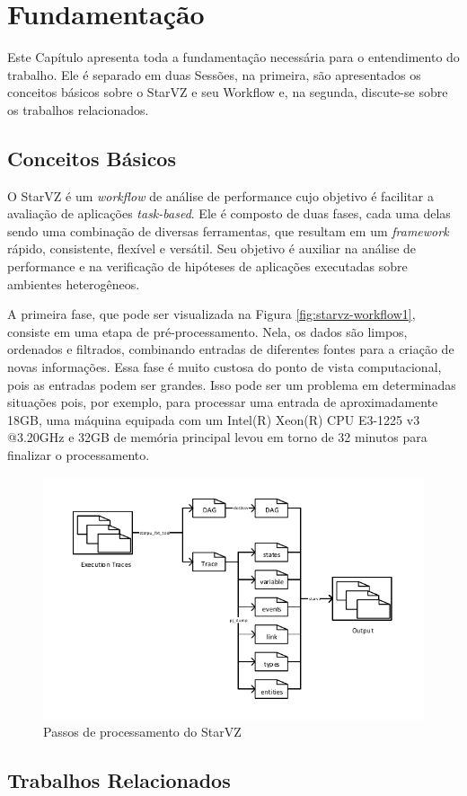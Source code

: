 \chapter{Fundamentação} \label{ch:fundamentation}

Este Capítulo apresenta toda a fundamentação necessária para o entendimento do trabalho. 
Ele é separado em duas Sessões, na primeira, são apresentados os conceitos básicos sobre 
o StarVZ e seu Workflow e, na segunda, discute-se sobre os trabalhos relacionados.

\section{Conceitos Básicos} \label{sect:basic-concepts}

O StarVZ \cite{ref:starvz} é um \emph{workflow} de análise de performance cujo objetivo é facilitar
a avaliação de aplicações \emph{task-based}. Ele é composto de duas fases, cada uma delas sendo uma 
combinação de diversas ferramentas, que resultam em um \emph{framework} rápido, consistente, flexível 
e versátil. Seu objetivo é auxiliar na análise de performance e na verificação de hipóteses de aplicações 
executadas sobre ambientes heterogêneos.

A primeira fase, que pode ser visualizada na Figura \ref{fig:starvz-workflow1}, consiste em uma etapa de pré-processamento.
Nela, os dados são limpos, ordenados e filtrados, combinando entradas de diferentes fontes para a criação de novas informações.
Essa fase é muito custosa do ponto de vista computacional, pois as entradas podem ser grandes. Isso pode ser um problema em 
determinadas situações pois, por exemplo, para processar uma entrada de aproximadamente 18GB, uma máquina equipada com um Intel(R)
Xeon(R) CPU E3-1225 v3 @3.20GHz e 32GB de memória principal levou em torno de 32 minutos para finalizar o processamento.

\begin{figure}[H]
 \centerline{\includegraphics[width=1\textwidth]{./img/step1-final.pdf}}
 \caption{Passos de processamento do StarVZ}
 \label{fig:starvz-steps}
\end{figure}

\section{Trabalhos Relacionados}\label{sect:related-work}